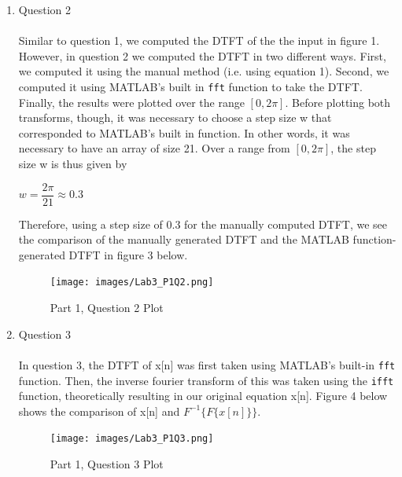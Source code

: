 \documentclass{article}
\begin{document}
\begin{enumerate}
\begin{enumerate}
        \item Question 2 \\ \\
            Similar to question 1, we computed the DTFT of the the input in figure 1. However, in question 2 we computed the DTFT in two different ways. First, we computed it using the manual method (i.e. using equation 1). Second, we computed it using MATLAB's built in \texttt{fft} function to take the DTFT. Finally, the results were plotted over the range $[0,2\pi]$. Before plotting both transforms, though, it was necessary to choose a step size w that corresponded to MATLAB's built in function. In other words, it was necessary to have an array of size 21. Over a range from $[0,2\pi]$, the step size w is thus given by
            \begin{center}
                $w = \dfrac{2\pi}{21} \approx 0.3$
            \end{center}
            Therefore, using a step size of 0.3 for the manually computed DTFT, we see the comparison of the manually generated DTFT and the MATLAB function-generated DTFT in figure 3 below.
            \begin{figure}[H]
                \begin{center}
                \texttt{[image: images/Lab3\_P1Q2.png]}
                    \caption{Part 1, Question 2 Plot}
                \end{center}
            \end{figure}
    
        \item Question 3 \\ \\
            In question 3, the DTFT of x[n] was first taken using MATLAB's built-in \texttt{fft} function. Then, the inverse fourier transform of this was taken using the \texttt{ifft} function, theoretically resulting in our original equation x[n]. Figure 4 below shows the comparison of x[n] and $F^{-1}\{F\{x[n]\}\}$.
            \begin{figure}[H]
                \begin{center}
                \texttt{[image: images/Lab3\_P1Q3.png]}
                    \caption{Part 1, Question 3 Plot}
                \end{center}
            \end{figure}

\end{enumerate}


\end{enumerate}
\end{document}
